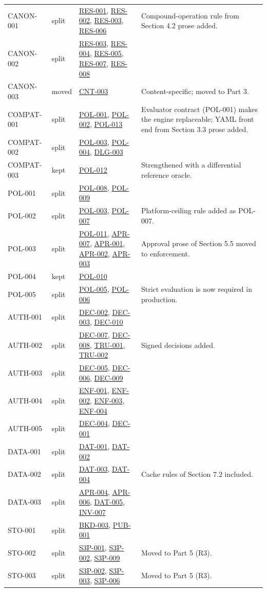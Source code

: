 \documentclass[11pt,a4paper]{article}
\newcommand{\rr}[1]{\hyperlink{req:#1}{#1}}
\begin{document}
\begin{longtable}{@{}P{0.16\textwidth}P{0.09\textwidth}P{0.37\textwidth}P{0.28\textwidth}@{}}
CANON-001 & split & \rr{RES-001}, \rr{RES-002}, \rr{RES-003}, \rr{RES-006} & Compound-operation rule from Section 4.2 prose added.\\
CANON-002 & split & \rr{RES-003}, \rr{RES-004}, \rr{RES-005}, \rr{RES-007}, \rr{RES-008} & \\
CANON-003 & moved & \rr{CNT-003} & Content-specific; moved to Part 3.\\
COMPAT-001 & split & \rr{POL-001}, \rr{POL-002}, \rr{POL-013} & Evaluator contract (POL-001) makes the engine replaceable; YAML front end from Section 3.3 prose added.\\
COMPAT-002 & split & \rr{POL-003}, \rr{POL-004}, \rr{DLG-003} & \\
COMPAT-003 & kept & \rr{POL-012} & Strengthened with a differential reference oracle.\\
POL-001 & split & \rr{POL-008}, \rr{POL-009} & \\
POL-002 & split & \rr{POL-003}, \rr{POL-007} & Platform-ceiling rule added as POL-007.\\
POL-003 & split & \rr{POL-011}, \rr{APR-007}, \rr{APR-001}, \rr{APR-002}, \rr{APR-003} & Approval prose of Section 5.5 moved to enforcement.\\
POL-004 & kept & \rr{POL-010} & \\
POL-005 & split & \rr{POL-005}, \rr{POL-006} & Strict evaluation is now required in production.\\
AUTH-001 & split & \rr{DEC-002}, \rr{DEC-003}, \rr{DEC-010} & \\
AUTH-002 & split & \rr{DEC-007}, \rr{DEC-008}, \rr{TRU-001}, \rr{TRU-002} & Signed decisions added.\\
AUTH-003 & split & \rr{DEC-005}, \rr{DEC-006}, \rr{DEC-009} & \\
AUTH-004 & split & \rr{ENF-001}, \rr{ENF-002}, \rr{ENF-003}, \rr{ENF-004} & \\
AUTH-005 & split & \rr{DEC-004}, \rr{DEC-001} & \\
DATA-001 & split & \rr{DAT-001}, \rr{DAT-002} & \\
DATA-002 & split & \rr{DAT-003}, \rr{DAT-004} & Cache rules of Section 7.2 included.\\
DATA-003 & split & \rr{APR-004}, \rr{APR-006}, \rr{DAT-005}, \rr{INV-007} & \\
STO-001 & split & \rr{BKD-003}, \rr{PUB-001} & \\
STO-002 & split & \rr{S3P-001}, \rr{S3P-002}, \rr{S3P-009} & Moved to Part 5 (R3).\\
STO-003 & split & \rr{S3P-002}, \rr{S3P-003}, \rr{S3P-006} & Moved to Part 5 (R3).\\

\end{longtable}
\end{document}
